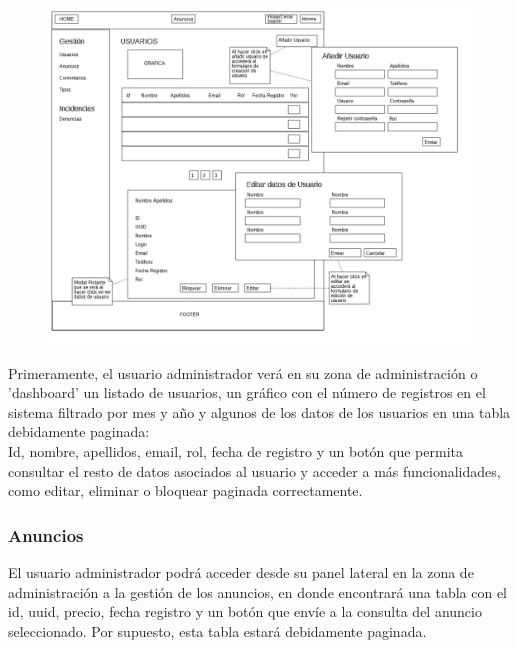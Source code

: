 \begin{figure}[h!]
\centering
\includegraphics[width=1\textwidth]{Img/VisionAplicacion/vision_8.jpg}
\end{figure}

Primeramente, el usuario administrador ver\'{a} en su zona de administraci\'{o}n o 'dashboard' un listado de usuarios, un gr\'{a}fico con el n\'{u}mero de registros en el sistema filtrado por mes y a\~{n}o y algunos de los datos de los usuarios en una tabla debidamente paginada: \\

Id, nombre, apellidos, email, rol, fecha de registro y un bot\'{o}n que permita consultar el resto de datos asociados al usuario y acceder a m\'{a}s funcionalidades, como editar, eliminar o bloquear paginada correctamente.




\subsubsection{Anuncios}
El usuario administrador podr\'{a} acceder desde su panel lateral en la zona de administraci\'{o}n a la gesti\'{o}n de los anuncios, en donde encontrar\'{a} una tabla con el id, uuid, precio, fecha registro y un bot\'{o}n que env\'{i}e a la consulta del anuncio seleccionado. Por supuesto, esta tabla estar\'{a} debidamente paginada.



